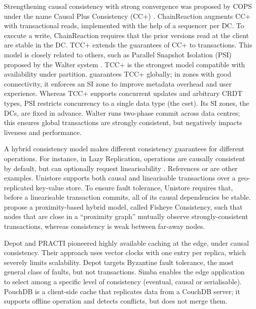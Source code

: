Strengthening causal consistency with strong convergence was proposed by
COPS under the name Causal Plus Consistency (CC+) \cite{rep:syn:1662}.
ChainReaction augments CC+ with transactional reads, implemented with
the help of a sequencer per DC.
To execute a write, ChainReaction requires that the prior versions read at the client are stable in the DC.
%
TCC+ \cite{rep:pro:sh182} extends the guarantees of CC+ to transactions.
This model is closely related to others, such as Parallel Snapshot
Isolation (PSI) proposed by the Walter system \cite{rep:syn:1661}.
TCC+ is the strongest model compatible with availability under partition.
\system{} guarantees TCC+ globally; in zones with good connectivity,
it enforces an SI zone to
improve metadata overhead and user experience.
Whereas TCC+ supports concurrent updates and arbitrary CRDT types, PSI
restricts concurrency to a single data type (the cset).
Its SI zones, the DCs, are fixed in advance.
Walter runs two-phase commit across data centres; this ensures global
transactions are strongly consistent, but negatively impacts liveness
and performance.

A hybrid consistency model makes different consistency guarantees for
different operations.
For instance, in Lazy Replication, operations are causally consistent by
default, but can optionally request linearisability \cite{pan:rep:1146}.
References
\citealp{alg:rep:syn:optim:1464,rep:syn:sh167} or \citealp{rep:syn:1690}
are other examples.
%
Unistore \cite{unistore} supports both causal and linearisable
transactions over a geo-replicated key-value store.
To ensure fault tolerance, Unistore requires that, before a linearisable
transaction commits, all of its causal dependencies be stable.
%
\citet{fisheye} propose a proximity-based hybrid model, called Fisheye
Consistency, such that nodes that are close in a ``proximity graph''
mutually observe strongly-consistent transactions, whereas consistency
is weak between far-away nodes.

Depot \cite{rep:1712} and PRACTI \cite{rep:syn:1729} pioneered
highly available caching at the edge, under causal consistency.
Their approach uses vector clocks with one entry per replica, which severely
limits scalability.
Depot targets Byzantine fault tolerance, the most general class of
faults, but not transactions.
Simba \cite{fic:syn:1731} enables the edge application to select among a
specific level of consistency (eventual, causal or serialisable).
PouchDB \cite{pouchDB} is a client-side cache that replicates data
from a CouchDB server; it supports offline operation and detects
conflicts, but does not merge them.

